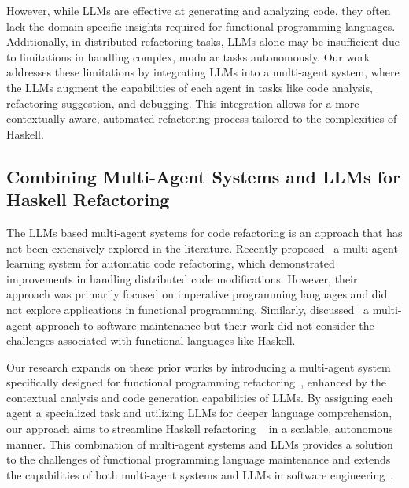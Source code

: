 However, while LLMs are effective at generating and analyzing code, they often lack the domain-specific insights required for functional programming languages. Additionally, in distributed refactoring tasks, LLMs alone may be insufficient due to limitations in handling complex, modular tasks autonomously. Our work addresses these limitations by integrating LLMs into a multi-agent system, where the LLMs augment the capabilities of each agent in tasks like code analysis, refactoring suggestion, and debugging. This integration allows for a more contextually aware, automated refactoring process tailored to the complexities of Haskell.

\subsection{Combining Multi-Agent Systems and LLMs for Haskell Refactoring}

The LLMs based multi-agent systems for code refactoring is an approach that has not been extensively explored in the literature. Recently proposed~\cite{baumgartner2024ai}\cite{xi2023rise} a multi-agent learning system for automatic code refactoring, which demonstrated improvements in handling distributed code modifications. However, their approach was primarily focused on imperative programming languages and did not explore applications in functional programming. Similarly, discussed~\cite{ayshwaryalakshmi2013agent}\cite{huang2024levels} a multi-agent approach to software maintenance but their work did not consider the challenges associated with functional languages like Haskell.

Our research expands on these prior works by introducing a multi-agent system~\cite{hua2023war} specifically designed for functional programming refactoring~\cite{dos2015autorefactoring}, enhanced by the contextual analysis and code generation capabilities of LLMs. By assigning each agent a specialized task and utilizing LLMs for deeper language comprehension, our approach aims to streamline Haskell refactoring ~\cite{thompson2013refactoring} in a scalable, autonomous manner. This combination of multi-agent systems and LLMs provides a solution to the challenges of functional programming language maintenance and extends the capabilities of both multi-agent systems and LLMs in software engineering~\cite{cheng2024exploring}.